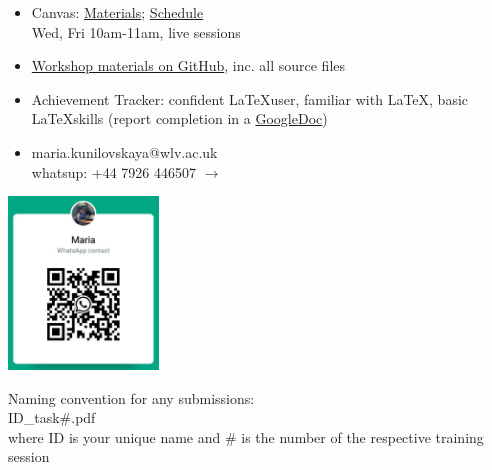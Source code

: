 \documentclass[a4paper,12pt]{article} %
\newcommand{\llogo}{\LaTeX }
\begin{document}
\begin{center}

\begin{tcolorbox}[width=\textwidth, colback={yellow!40!white}, title={\textbf{Housekeeping}}, colbacktitle=yellow!60!white, coltitle=black]
	
	\begin{multicols}{2}

		\begin{itemize}
			\item Canvas: \href{https://canvas.wlv.ac.uk/courses/33429/files/folder/latex_mendeley_github}{Materials}; \href{https://wlv.instructure.com/courses/33429/pages/latex-and-mendeley-workshop}{Schedule} \\ Wed, Fri 10am-11am, live sessions
			\item \href{https://github.com/kunilovskaya/dskills_workshop}{Workshop materials on GitHub}, inc. all source files 
			\item Achievement Tracker: confident \llogo user, familiar with \LaTeX, basic \llogo skills (report completion in a \href{https://docs.google.com/document/d/17ZBAQGBKIlO6JMwxz3LlghYq1sdsUjhHVXga46BK0kg/edit?usp=sharing}{GoogleDoc})
			\item maria.kunilovskaya@wlv.ac.uk \\ whatsup: +44 7926 446507 $\rightarrow$
		\end{itemize}
	
	\columnbreak
	\centering
	 \includegraphics[width=40mm]{maria_ku_whatsup_contact}%
	 
	Naming convention for any submissions: \\
	ID\_task\#.pdf \\
	where 
	ID is your unique name and 
	\# is the number of the respective training session
	 
\end{multicols}
\end{tcolorbox}%

\bigskip%


\end{center}
\end{document}
